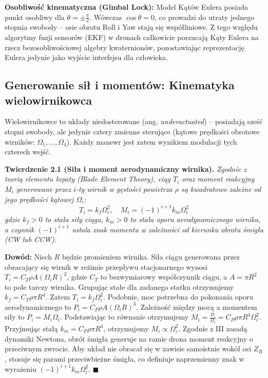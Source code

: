 \textbf{Osobliwość kinematyczna (Gimbal Lock):} Model Kątów Eulera posiada punkt osobliwy dla $\theta = \pm \frac{\pi}{2}$. Wówczas $\cos\theta = 0$, co prowadzi do utraty jednego stopnia swobody – osie obrotu Roll i Yaw stają się współliniowe. Z tego względu algorytmy fuzji sensorów (EKF) w dronach całkowicie porzucają Kąty Eulera na rzecz bezosobliwościowej algebry kwaternionów, pozostawiając reprezentację Eulera jedynie jako wyjście interfejsu dla człowieka.

\subsection{Generowanie sił i momentów: Kinematyka wielowirnikowca}

Wielowirnikowce to układy niedosterowane (ang. \textit{underactuated}) – posiadają sześć stopni swobody, ale jedynie cztery zmienne sterujące (kątowe prędkości obrotowe wirników: $\Omega_1, \dots, \Omega_4$). Każdy manewr jest zatem wynikiem modulacji tych czterech wejść.

\textbf{Twierdzenie 2.1 (Siła i moment aerodynamiczny wirnika).}
\textit{Zgodnie z teorią elementu łopaty (Blade Element Theory), ciąg $T_i$ oraz moment reakcyjny $M_i$ generowane przez $i$-ty wirnik w gęstości powietrza $\rho$ są kwadratowo zależne od jego prędkości kątowej $\Omega_i$:}
\begin{equation}
    T_i = k_f \Omega_i^2, \quad M_i = (-1)^{i+1} k_m \Omega_i^2
\end{equation}
\textit{gdzie $k_f > 0$ to stała siły ciągu, $k_m > 0$ to stała oporu aerodynamicznego wirnika, a czynnik $(-1)^{i+1}$ ustala znak momentu w zależności od kierunku obrotu śmigła (CW lub CCW).}

\textbf{Dowód:} 
Niech $R$ będzie promieniem wirnika. Siła ciągu generowana przez obracający się wirnik w reżimie przepływu stacjonarnego wynosi $T_i = C_T \rho A (\Omega_i R)^2$, gdzie $C_T$ to bezwymiarowy współczynnik ciągu, a $A = \pi R^2$ to pole tarczy wirnika. Grupując stałe dla zadanego statku otrzymujemy $k_f = C_T \rho \pi R^4$. Zatem $T_i = k_f \Omega_i^2$.
Podobnie, moc potrzebna do pokonania oporu aerodynamicznego to $P_i = C_P \rho A (\Omega_i R)^3$. Zależność między mocą a momentem siły to $P_i = M_i \Omega_i$. Podstawiając to równanie otrzymujemy $M_i = \frac{P_i}{\Omega_i} = C_P \rho \pi R^4 \Omega_i^2$. Przyjmując stałą $k_m = C_P \rho \pi R^4$, otrzymujemy $M_i \propto \Omega_i^2$.
Zgodnie z III zasadą dynamiki Newtona, obrót śmigła generuje na ramie drona moment reakcyjny o przeciwnym zwrocie. Aby układ nie obracał się w zawisie samoistnie wokół osi $Z_B$, stosuje się parami przeciwbieżne śmigła, co definiuje naprzemienny znak w wyrażeniu $(-1)^{i+1} k_m \Omega_i^2$. $\blacksquare$

